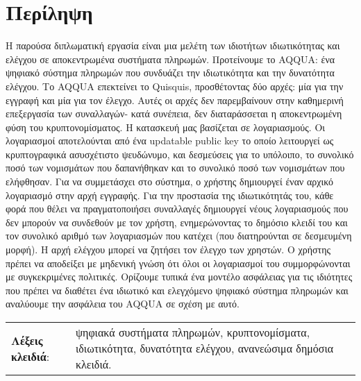 \chapter*{Περίληψη}
Η παρούσα διπλωματική εργασία είναι μια μελέτη των ιδιοτήτων ιδιωτικότητας και ελέγχου σε αποκεντρωμένα συστήματα πληρωμών.
Προτείνουμε το AQQUA: ένα ψηφιακό σύστημα πληρωμών που συνδυάζει την ιδιωτικότητα και την δυνατότητα ελέγχου.
Το AQQUA επεκτείνει το Quisquis, προσθέτοντας δύο αρχές: μία για την εγγραφή και μία για τον έλεγχο.
Αυτές οι αρχές δεν παρεμβαίνουν στην καθημερινή επεξεργασία των συναλλαγών- κατά συνέπεια, δεν διαταράσσεται η αποκεντρωμένη φύση του κρυπτονομίσματος. 
Η κατασκευή μας βασίζεται σε λογαριασμούς. 
Οι λογαριασμοί αποτελούνται από ένα updatable public key το οποίο λειτουργεί ως κρυπτογραφικά ασυσχέτιστο ψευδώνυμο,
και δεσμεύσεις για το υπόλοιπο, το συνολικό ποσό των νομισμάτων που δαπανήθηκαν και το συνολικό ποσό των νομισμάτων που ελήφθησαν.
Για να συμμετάσχει στο σύστημα, ο χρήστης δημιουργεί έναν αρχικό λογαριασμό στην αρχή εγγραφής. 
Για την προστασία της ιδιωτικότητάς του, κάθε φορά που θέλει να πραγματοποιήσει συναλλαγές δημιουργεί νέους λογαριασμούς που δεν μπορούν να συνδεθούν με τον χρήστη, ενημερώνοντας το δημόσιο κλειδί του και τον συνολικό αριθμό των λογαριασμών που κατέχει (που διατηρούνται σε δεσμευμένη μορφή). 
Η αρχή ελέγχου μπορεί να ζητήσει τον έλεγχο των χρηστών. Ο χρήστης πρέπει να αποδείξει με μηδενική γνώση ότι όλοι οι λογαριασμοί του συμμορφώνονται με συγκεκριμένες πολιτικές.
Ορίζουμε τυπικά ένα μοντέλο ασφάλειας για τις ιδιότητες που πρέπει να διαθέτει ένα ιδιωτικό και ελεγχόμενο ψηφιακό σύστημα πληρωμών και αναλύουμε την ασφάλεια του AQQUA σε σχέση με αυτό. 
\vspace{20ex}

\newlength\mylen
\settowidth{} %

\begin{table}[ht]
    \centering
    \begin{tabular}{p{1.5\mylen} p{\linewidth - 1.5\mylen}}
      \textbf{Λέξεις κλειδιά}: & ψηφιακά συστήματα πληρωμών, κρυπτονομίσματα, ιδιωτικότητα, δυνατότητα ελέγχου, ανανεώσιμα δημόσια κλειδιά. \\
    \end{tabular}
\end{table}


\newpage
\hspace{10pt}

\newpage
